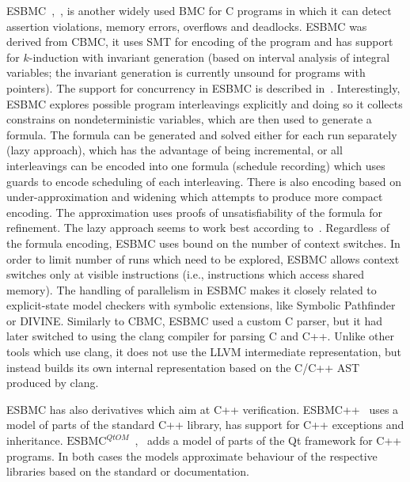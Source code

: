
ESBMC~\cite{Gadelha2018},~\cite{Gadelha2019}, is another widely used BMC for C
programs in which it can detect assertion violations, memory errors, overflows and  deadlocks.
ESBMC was derived from CBMC, it uses SMT for encoding of the program and has
support for $k$-induction with invariant generation (based on interval analysis
of integral variables; the invariant generation is currently unsound for
programs with pointers).
The support for concurrency in ESBMC is described in~\cite{Cordeiro2011}.
Interestingly, ESBMC explores possible program interleavings explicitly and
doing so it collects constrains on nondeterministic variables, which are then
used to generate a formula.
The formula can be generated and solved either for each run separately (lazy
approach), which has the advantage of being incremental, or all interleavings
can be encoded into one formula (schedule recording) which uses guards to
encode scheduling of each interleaving.
There is also encoding based on under-approximation and widening which attempts
to produce more compact encoding.
The approximation uses proofs of unsatisfiability of the formula for refinement.
The lazy approach seems to work best according to~\cite{Cordeiro2011}.
Regardless of the formula encoding, ESBMC uses bound on the number of context
switches.
In order to limit number of runs which need to be explored, ESBMC allows
context switches only at visible instructions (i.e., instructions which access
shared memory).
The handling of parallelism in ESBMC makes it closely related to explicit-state
model checkers with symbolic extensions, like Symbolic Pathfinder or DIVINE.
Similarly to CBMC, ESBMC used a custom C parser, but it had later switched to
using the clang compiler for parsing C and C++.
Unlike other tools which use clang, it does not use the LLVM intermediate
representation, but instead builds its own internal representation based on the
C/C++ AST produced by clang.

ESBMC has also derivatives which aim at C++ verification.
ESBMC++~\cite{Ramalho2013} uses a model of parts of the standard C++ library,
has support for C++ exceptions and inheritance.
$\text{ESBMC}^{\textit{Qt}OM}$~\cite{Sousa2015},~\cite{Garcia2016} adds a model
of parts of the Qt framework for C++ programs.
In both cases the models approximate behaviour of the respective libraries
based on the standard or documentation.

